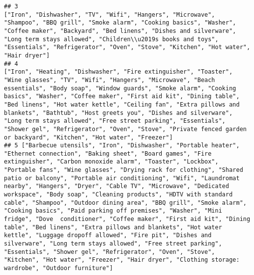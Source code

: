 \documentclass[
]{article}
\begin{document}
\begin{verbatim}
## 3                                                                                                                                                                                                                                                                                                                                                                                                                                                                                                                                                                                                                                                                                       ["Iron", "Dishwasher", "TV", "Wifi", "Hangers", "Microwave", "Shampoo", "BBQ grill", "Smoke alarm", "Cooking basics", "Washer", "Coffee maker", "Backyard", "Bed linens", "Dishes and silverware", "Long term stays allowed", "Children\\u2019s books and toys", "Essentials", "Refrigerator", "Oven", "Stove", "Kitchen", "Hot water", "Hair dryer"]
## 4                                                                                                                                                                                                                                                                                                                                                                                                                                          ["Iron", "Heating", "Dishwasher", "Fire extinguisher", "Toaster", "Wine glasses", "TV", "Wifi", "Hangers", "Microwave", "Beach essentials", "Body soap", "Window guards", "Smoke alarm", "Cooking basics", "Washer", "Coffee maker", "First aid kit", "Dining table", "Bed linens", "Hot water kettle", "Ceiling fan", "Extra pillows and blankets", "Bathtub", "Host greets you", "Dishes and silverware", "Long term stays allowed", "Free street parking", "Essentials", "Shower gel", "Refrigerator", "Oven", "Stove", "Private fenced garden or backyard", "Kitchen", "Hot water", "Freezer"]
## 5 ["Barbecue utensils", "Iron", "Dishwasher", "Portable heater", "Ethernet connection", "Baking sheet", "Board games", "Fire extinguisher", "Carbon monoxide alarm", "Toaster", "Lockbox", "Portable fans", "Wine glasses", "Drying rack for clothing", "Shared patio or balcony", "Portable air conditioning", "Wifi", "Laundromat nearby", "Hangers", "Dryer", "Cable TV", "Microwave", "Dedicated workspace", "Body soap", "Cleaning products", "HDTV with standard cable", "Shampoo", "Outdoor dining area", "BBQ grill", "Smoke alarm", "Cooking basics", "Paid parking off premises", "Washer", "Mini fridge", "Dove  conditioner", "Coffee maker", "First aid kit", "Dining table", "Bed linens", "Extra pillows and blankets", "Hot water kettle", "Luggage dropoff allowed", "Fire pit", "Dishes and silverware", "Long term stays allowed", "Free street parking", "Essentials", "Shower gel", "Refrigerator", "Oven", "Stove", "Kitchen", "Hot water", "Freezer", "Hair dryer", "Clothing storage: wardrobe", "Outdoor furniture"]

\end{verbatim}
\end{document}
